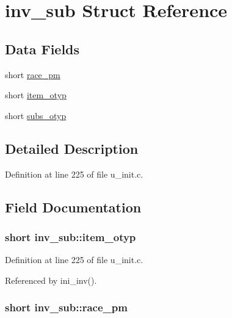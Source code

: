 \hypertarget{structinv__sub}{\section{inv\+\_\+sub Struct Reference}
\label{structinv__sub}
}
\subsection*{Data Fields}
\begin{DoxyCompactItemize}
\item 
short \hyperlink{structinv__sub_a284d76931fb0b4cf50545afcafec2d28}{race\+\_\+pm}
\item 
short \hyperlink{structinv__sub_aa697a134b90d7120796f89ed8a0e3067}{item\+\_\+otyp}
\item 
short \hyperlink{structinv__sub_a880826fb766b8e8f95b019b96c52ddfc}{subs\+\_\+otyp}
\end{DoxyCompactItemize}


\subsection{Detailed Description}


Definition at line 225 of file u\+\_\+init.\+c.



\subsection{Field Documentation}
\hypertarget{structinv__sub_aa697a134b90d7120796f89ed8a0e3067}{
\subsubsection[{item\+\_\+otyp}]{\setlength{\rightskip}{0pt plus 5cm}short inv\+\_\+sub\+::item\+\_\+otyp}}\label{structinv__sub_aa697a134b90d7120796f89ed8a0e3067}


Definition at line 225 of file u\+\_\+init.\+c.



Referenced by ini\+\_\+inv().

\hypertarget{structinv__sub_a284d76931fb0b4cf50545afcafec2d28}{
\subsubsection[{race\+\_\+pm}]{\setlength{\rightskip}{0pt plus 5cm}short inv\+\_\+sub\+::race\+\_\+pm}}\label{structinv__sub_a284d76931fb0b4cf50545afcafec2d28}


